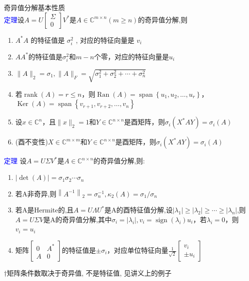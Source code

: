 \documentclass[12pt,a4paper]{article}
\begin{document}
\noindent 奇异值分解基本性质\\
\textcolor{blue}{定理}设$A=U\left[\begin{array}{l}{\Sigma} \\ {0}\end{array}\right] V^{*}$是$A \in \mathbb{C}^{m \times n}(m \geq n)$的奇异值分解,则
\begin{enumerate}[(1)]
	\item $A^{*} A$ 的特征值是 $\sigma_{i}^{2}$ , 对应的特征向量是 $v_{i}$
	\item $AA^{*}$的特征值是$\sigma_{i}^{2}$和$m-n$个零，对应的特征向量是$u_{i}$
	\item $\|A\|_{2}=\sigma_{1},\|A\|_{F}=\sqrt{\sigma_{1}^{2}+\sigma_{2}^{2}+\cdots+\sigma_{n}^{2}}$
	\item 若$\operatorname{rank}(A)=r \leq n$，则$\operatorname{Ran}(A)=\operatorname{span}\left\{u_{1}, u_{2}, \ldots, u_{r}\right\}$，$\operatorname{Ker}(A)=\operatorname{span}\left\{v_{r+1}, v_{r+2}, \ldots, v_{n}\right\}$
	\item 设$x \in \mathbb{C}^{n}$，且$\|x\|_{2}=1$和$Y \in \mathbb{C}^{n \times n}$是酉矩阵，则$\sigma_{i}\left(X^{*} A Y\right)=\sigma_{i}(A)$
	\item (酉不变性)$X \in \mathbb{C}^{m \times m}$和$Y \in \mathbb{C}^{n \times n}$是酉矩阵，则$\sigma_{i}\left(X^{*} A Y\right)=\sigma_{i}(A)$
\end{enumerate}
\textcolor{blue}{定理} 设$A=U \Sigma V^{*}$是$A \in \mathbb{C}^{n \times n}$的奇异值分解,则:
\begin{enumerate}[(1)]
	\item $|\operatorname{det}(A)|=\sigma_{1} \sigma_{2} \cdots \sigma_{n}$
	\item 若A非奇异,则$\left\|A^{-1}\right\|_{2}=\sigma_{n}^{-1}, \kappa_{2}(A)=\sigma_{1} / \sigma_{n}$
	\item 若A是Hermite的,且$A=U \Lambda U^{*}$是A的酉特征值分解,设$\left|\lambda_{1}\right| \geq\left|\lambda_{2}\right| \geq \cdots \geq\left|\lambda_{n}\right|$,则$A=U \Sigma V$是A的奇异值分解,其中$\sigma_{i}=\left|\lambda_{i}\right|, v_{i}=\operatorname{sign}\left(\lambda_{i}\right) u_{i}$，若$\lambda_{i}=0$，则$v_{i}=u_{i}$
	\item 矩阵$\left[\begin{array}{cc}{0} & {A^{*}} \\ {A} & {0}\end{array}\right]$的特征值是$\pm \sigma_{i}$，对应单位特征向量$\frac{1}{\sqrt{2}}\left[\begin{array}{c}{v_{i}} \\ { \pm u_{i}}\end{array}\right]$
\end{enumerate}
$\dagger$矩阵条件数取决于奇异值, 不是特征值, 见讲义上的例子\\
\end{document}
